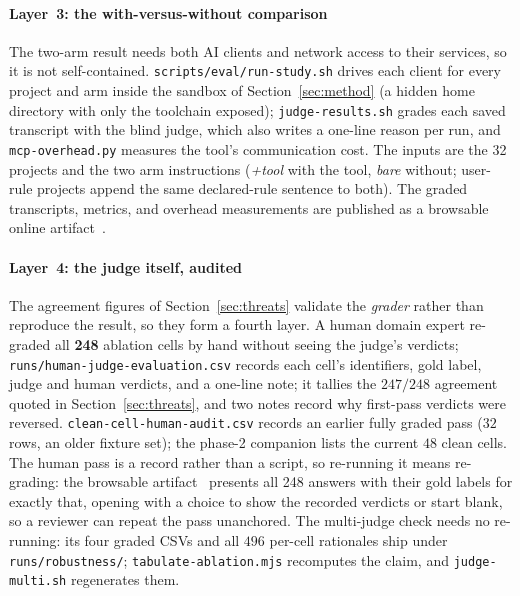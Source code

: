 \documentclass[conference]{IEEEtran}
\begin{document}
\paragraph{Layer~3: the with-versus-without comparison} The two-arm result needs both AI
clients and network access to their services, so it is not self-contained.
\texttt{scripts/eval/run-study.sh} drives each client for every project and arm inside the sandbox of
Section~\ref{sec:method} (a hidden home directory with only the toolchain exposed);
\texttt{judge-results.sh} grades each saved transcript with the blind judge, which also writes a
one-line reason per run, and \texttt{mcp-overhead.py} measures the tool's communication cost. The
inputs are the 32 projects and the two arm instructions (\emph{+tool} with the tool, \emph{bare}
without; user-rule projects append the same declared-rule sentence to both). The graded transcripts, metrics, and overhead measurements are published as a browsable
online artifact~\cite{artifact-ablation}.

\paragraph{Layer~4: the judge itself, audited} The agreement figures of
Section~\ref{sec:threats} validate the \emph{grader} rather than reproduce the result, so they
form a fourth layer. A human domain expert re-graded all \textbf{248} ablation cells by hand without
seeing the judge's verdicts; \texttt{runs/human-judge-evaluation.csv} records each cell's
identifiers, gold label, judge and human verdicts, and a one-line note; it
tallies the $247/248$ agreement quoted in Section~\ref{sec:threats}, and two notes record why
first-pass verdicts were reversed. \texttt{clean-cell-human-audit.csv} records an earlier fully
graded pass ($32$ rows, an older fixture set); the phase-2 companion lists the current $48$
clean cells. The human
pass is a record rather than a script, so re-running it means re-grading: the browsable
artifact~\cite{artifact-human} presents all 248 answers with their gold labels for exactly that,
opening with a choice to show the recorded verdicts or start blank, so a reviewer can repeat
the pass unanchored. The multi-judge check needs no re-running: its four graded CSVs and all $496$
per-cell rationales ship under \texttt{runs/robustness/}; \texttt{tabulate-ablation.mjs}
recomputes the claim, and \texttt{judge-multi.sh} regenerates them.
\end{document}
